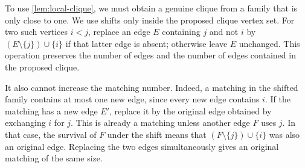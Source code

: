 To use \cref{lem:local-clique}, we must obtain a genuine clique from a family that is only close to one. We use shifts only inside the proposed clique vertex set. For two such vertices $i<j$, replace an edge $E$ containing $j$ and not $i$ by $(E\setminus\{j\})\cup\{i\}$ if that latter edge is absent; otherwise leave $E$ unchanged. This operation preserves the number of edges and the number of edges contained in the proposed clique.

It also cannot increase the matching number. Indeed, a matching in the shifted family contains at most one new edge, since every new edge contains $i$. If the matching has a new edge $E'$, replace it by the original edge obtained by exchanging $i$ for $j$. This is already a matching unless another edge $F$ uses $j$. In that case, the survival of $F$ under the shift means that $(F\setminus\{j\})\cup\{i\}$ was also an original edge. Replacing the two edges simultaneously gives an original matching of the same size.

